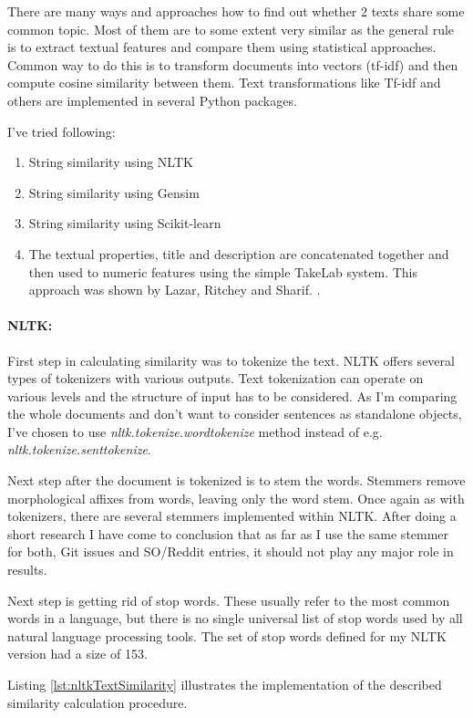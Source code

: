 There are many ways and approaches how to find out whether 2 texts share some common topic. Most of them are to some extent very similar as the general rule is to extract textual features and compare them using statistical approaches. Common way to do this is to transform documents into vectors (tf-idf) and then compute cosine similarity between them. Text transformations like Tf-idf and others are implemented in several Python packages.

I've tried following:
\begin{enumerate}
\item String similarity using NLTK
\item String similarity using Gensim
\item String similarity using Scikit-learn
\item The textual properties, title and description
are concatenated together and then used to numeric features using the simple TakeLab system. This approach was shown by Lazar, Ritchey and Sharif. \cite{lazar2014improving}.
\end{enumerate}

\paragraph{NLTK:}First step in calculating similarity was to tokenize the text. NLTK offers several types of tokenizers with various outputs. Text tokenization can operate on various levels and the structure of input has to be considered. As I'm comparing the whole documents and don't want to consider sentences as standalone objects, I've chosen to use \textit{nltk.tokenize.wordtokenize} method instead of e.g. \textit{nltk.tokenize.senttokenize}.

Next step after the document is tokenized is to stem the words. Stemmers remove morphological affixes from words, leaving only the word stem. Once again as with tokenizers, there are several stemmers implemented within NLTK. After doing a short research I have come to conclusion that as far as I use the same stemmer for both, Git issues and SO/Reddit entries, it should not play any major role in results.

Next step is getting rid of stop words. These usually refer to the most common words in a language, but there is no single universal list of stop words used by all natural language processing tools. The set of stop words defined for my NLTK version had a size of 153.

Listing \ref{lst:nltkTextSimilarity} illustrates the implementation of the described similarity calculation procedure.

